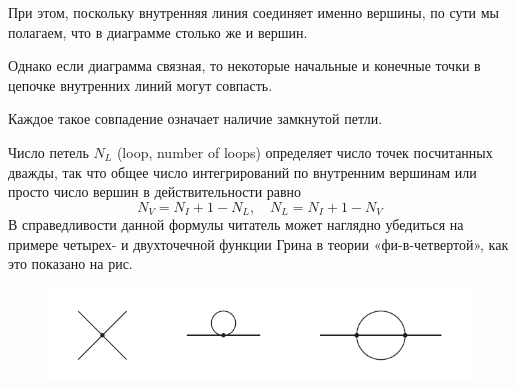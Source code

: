 \documentclass[a4paper,12pt]{article} %
\begin{document}
\begin{ttask}
При этом, поскольку внутренняя линия соединяет именно вершины, 
по сути мы полагаем, что в диаграмме столько же и вершин.

Однако если диаграмма связная, то некоторые начальные и конечные точки в цепочке внутренних линий могут совпасть. 

Каждое такое совпадение означает наличие замкнутой петли. 


Число петель $N_{L}$ (loop, number of loops) определяет число точек посчитанных дважды, так что общее число интегрирований 
по внутренним вершинам или просто число вершин в действительности равно
$$
N_{V}=N_{I}+1-N_{L}, 
\quad 
N_{L}=N_{I}+1-N_{V}
$$
В справедливости данной формулы читатель может наглядно убедиться 
на примере четырех- и двухточечной функции Грина в теории «фи-в-четвертой», как это показано на рис.  




\begin{figure}[H]
	\centering
	\includegraphics[width=1\linewidth]{pic/petly}
	\caption{}
	\label{fig:petly}
\end{figure}





















\end{ttask}
\end{document}
